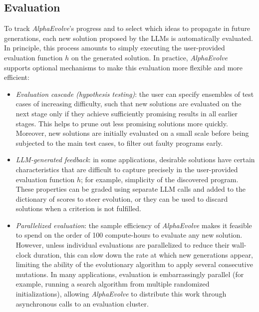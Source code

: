 \documentclass[logo,copyright,12pt]{googledeepmind}
\theoremstyle{definition}
\theoremstyle{remark}
\theoremstyle{plain}
\newcommand{\method}{\emph{AlphaEvolve}\xspace}
\begin{document}
\subsection{Evaluation}
\label{subsec:evaluation}

To track \method's progress and to select which ideas to propagate in future generations, each new solution proposed by the LLMs is automatically evaluated.
In principle, this process amounts to simply executing the user-provided evaluation function $h$ on the generated solution.
In practice, \method supports optional mechanisms to make this evaluation more flexible and more efficient:
\begin{itemize}
\item
\emph{Evaluation cascade (hypothesis testing)}: the user can specify ensembles of test cases of increasing difficulty, such that new solutions are  evaluated on the next stage only if they achieve sufficiently promising results in all earlier stages.
This helps to prune out less promising solutions more quickly. Moreover, new solutions are initially evaluated on a small scale before being subjected to the main test cases, to filter out faulty programs early.
\item
\emph{LLM-generated feedback}: in some applications, desirable solutions have certain characteristics that are difficult to capture precisely in the user-provided evaluation function $h$; for example, simplicity of the discovered program.
These properties can be graded using separate LLM calls and added to the dictionary of scores to steer evolution, or they can be used to discard solutions when a criterion is not fulfilled.
\item
\emph{Parallelized evaluation}: the sample efficiency of \method makes it feasible to spend on the order of 100 compute-hours to evaluate any new solution.
However, unless individual evaluations are parallelized to reduce their wall-clock duration, this can slow down the rate at which new generations appear, limiting the ability of the evolutionary algorithm to apply several consecutive mutations.
In many applications, evaluation is embarrassingly parallel (for example, running a search algorithm from multiple randomized initializations), allowing \method to distribute this work through asynchronous calls to an evaluation cluster.
\end{itemize}
\end{document}
